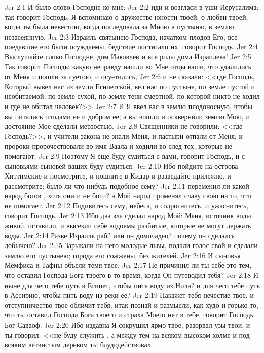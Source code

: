 \vs Jer 2:1 И было слово Господне ко мне:
\vs Jer 2:2 иди и возгласи в уши  Иерусалима: так говорит Господь: Я вспоминаю о дружестве юности твоей, о любви твоей, когда ты была невестою, когда последовала за Мною в пустыню, в землю незасеянную.
\vs Jer 2:3 Израиль  святынею Господа, начатком плодов Его; все поедавшие его были осуждаемы, бедствие постигало их, говорит Господь.
\rsbpar\vs Jer 2:4 Выслушайте слово Господне, дом Иаковлев и все роды дома Израилева!
\vs Jer 2:5 Так говорит Господь: какую неправду нашли во Мне отцы ваши, что удалились от Меня и пошли за суетою, и осуетились,
\vs Jer 2:6 и не сказали: <<где Господь, Который вывел нас из земли Египетской, вел нас по пустыне, по земле пустой и необитаемой, по земле сухой, по земле тени смертной, по которой никто не ходил и где не обитал человек?>>
\vs Jer 2:7 И Я ввел вас в землю плодоносную, чтобы вы питались плодами ее и добром ее; а вы вошли и осквернили землю Мою, и достояние Мое сделали мерзостью.
\vs Jer 2:8 Священники не говорили: <<где Господь?>>, и учители закона не знали Меня, и пастыри отпали от Меня, и пророки пророчествовали во имя Ваала и ходили во след тех, которые не помогают.
\vs Jer 2:9 Поэтому Я еще буду судиться с вами, говорит Господь, и с сыновьями сыновей ваших буду судиться.
\vs Jer 2:10 Ибо пойдите на острова Хиттимские и посмотрите, и пошлите в Кидар и разведайте прилежно, и рассмотрите: было ли  что-нибудь подобное сему?
\vs Jer 2:11 переменил ли какой народ богов , хотя они и не боги? а Мой народ променял славу свою на то, что не помогает.
\vs Jer 2:12 Подивитесь сему, небеса, и содрогнитесь, и ужаснитесь, говорит Господь.
\vs Jer 2:13 Ибо два зла сделал народ Мой: Меня, источник воды живой, оставили, и высекли себе водоемы разбитые, которые не могут держать воды.
\vs Jer 2:14 Разве Израиль раб? или он домочадец? почему он сделался добычею?
\vs Jer 2:15 Зарыкали на него молодые львы, подали голос свой и сделали землю его пустынею; города его сожжены, без жителей.
\vs Jer 2:16 И сыновья Мемфиса и Тафны объели темя твое.
\vs Jer 2:17 Не причинил ли ты себе это тем, что оставил Господа Бога твоего в то время, когда Он путеводил тебя?
\vs Jer 2:18 И ныне для чего тебе путь в Египет, чтобы пить воду из Нила? и для чего тебе путь в Ассирию, чтобы пить воду из реки ее?
\vs Jer 2:19 Накажет тебя нечестие твое, и отступничество твое обличит тебя; итак познай и размысли, как худо и горько то, что ты оставил Господа Бога твоего и страха Моего нет в тебе, говорит Господь Бог Саваоф.
\vs Jer 2:20 Ибо издавна Я сокрушил ярмо твое, разорвал узы твои, и ты говорил: <<не буду служить , а между тем на всяком высоком холме и под всяким ветвистым деревом ты блудодействовал.
